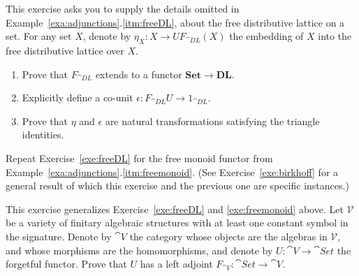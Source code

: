 \begin{exercise}\label{exe:freeDL}
  This exercise asks you to supply the details omitted in Example~\ref{exa:adjunctions}.\ref{itm:freeDL}, about the free distributive lattice on a set. For any set $X$, denote by $\eta_X \colon X \to UF_{\cat{DL}}(X)$ the embedding of $X$ into the free distributive lattice over $X$.
  \begin{enumerate}
  \item Prove that $F_{\cat{DL}}$ extends to a functor $\mathbf{Set} \to \mathbf{DL}$.
  \item Explicitly define a co-unit $\epsilon \colon F_{\cat{DL}} U \to 1_{\cat{DL}}$.
  \item Prove that $\eta$ and $\epsilon$ are natural transformations satisfying the triangle identities.
    \end{enumerate}
  \end{exercise}

\begin{exercise}\label{exe:freemonoid}
Repeat Exercise~\ref{exe:freeDL} for the free monoid functor from Example~\ref{exa:adjunctions}.\ref{itm:freemonoid}. (See Exercise~\ref{exe:birkhoff} for a general result of which this exercise and the previous one are specific instances.)
\end{exercise}


\begin{exercise}\label{exe:birkhoff}This exercise generalizes Exercise~\ref{exe:freeDL} and \ref{exe:freemonoid} above. Let $\mathcal{V}$ be a variety of finitary algebraic structures with at least one constant symbol in the signature. Denote by $\cat{V}$ the category whose objects are the algebras in $\mathcal{V}$, and whose morphisms are the homomorphisms, and denote by $U \colon \cat{V} \to \cat{Set}$ the forgetful functor. Prove that $U$ has a left adjoint $F_{\cat{V}} \colon \cat{Set} \to \cat{V}$.

  \end{exercise}

